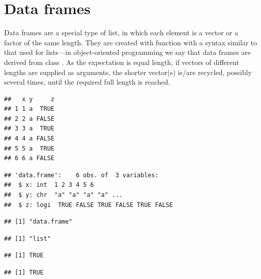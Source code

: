 \documentclass[krantz2]{krantz}\usepackage{knitr}
\begin{document}

\section{Data frames}\label{sec:R:data:frames}
Data frames are a special type of list, in which each element is a vector or a factor of the same length. They are created with function  with a syntax similar to that used for lists---in object-oriented programming we say that data frames are derived from class . As the expectation is equal length, if vectors of different lengths are supplied as arguments, the shorter vector(s) is/are recycled, possibly several times, until the required full length is reached.

\begin{knitrout}\footnotesize
{}\color{fgcolor}\begin{kframe}
\begin{alltt}
 \hlkwb{<-} \hlstd{(} \hlstd{=} \hlopt{:}\hlstd{,}  \hlstd{=} \hlstd{,}  \hlstd{=} \hlstd{(}\hlstd{,} \hlstd{))}
\end{alltt}
\begin{verbatim}
##   x y     z
## 1 1 a  TRUE
## 2 2 a FALSE
## 3 3 a  TRUE
## 4 4 a FALSE
## 5 5 a  TRUE
## 6 6 a FALSE
\end{verbatim}
\begin{alltt}
\end{alltt}
\begin{verbatim}
## 'data.frame':	6 obs. of  3 variables:
##  $ x: int  1 2 3 4 5 6
##  $ y: chr  "a" "a" "a" "a" ...
##  $ z: logi  TRUE FALSE TRUE FALSE TRUE FALSE
\end{verbatim}
\begin{alltt}
\end{alltt}
\begin{verbatim}
## [1] "data.frame"
\end{verbatim}
\begin{alltt}
\end{alltt}
\begin{verbatim}
## [1] "list"
\end{verbatim}
\begin{alltt}
\end{alltt}
\begin{verbatim}
## [1] TRUE
\end{verbatim}
\begin{alltt}
\end{alltt}
\begin{verbatim}
## [1] TRUE
\end{verbatim}
\end{kframe}
\end{knitrout}
\end{document}
